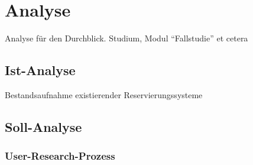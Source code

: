 \chapter{Analyse} 
	
	Analyse für den Durchblick.
	Studium, Modul \enquote{Fallstudie} et cetera
	
	\section{Ist-Analyse}
	Bestandsaufnahme existierender Reservierungssysteme
	
	\section{Soll-Analyse}
	 	\subsection{User-Research-Prozess} 
